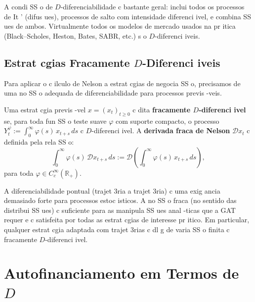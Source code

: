 {A condi SS o de $D$-diferenciabilidade c bastante geral: inclui todos os
processos de It ' (difus ues), processos de salto com intensidade
diferenci ivel, e combina SS ues de ambos. Virtualmente todos os modelos
de mercado usados na pr itica (Black--Scholes, Heston, Bates, SABR,
etc.) s o $D$-diferenci iveis.

\subsection{Estrat cgias Fracamente $D$-Diferenci iveis}

Para aplicar o c ilculo de Nelson a estrat cgias de negocia SS o, precisamos
de uma no SS o adequada de diferenciabilidade para processos previs -veis.

\begin{defi}\label{def:weak_D_strategy}
Uma estrat cgia previs -vel $x = (x_t)_{t \geq 0}$ c dita
\textbf{fracamente $D$-diferenci ivel} se, para toda fun SS o teste suave
$\varphi$ com suporte compacto, o processo $Y_t^\varphi :=
\int_0^\infty \varphi(s)\,x_{t+s}\,ds$ c $D$-diferenci ivel. A
\textbf{derivada fraca de Nelson} $\mathcal{D}x_t$ c definida pela
rela SS o:
\begin{equation}\label{eq:weak_D}
 \int_0^\infty \varphi(s)\,\mathcal{D}x_{t+s}\,ds
 := \mathcal{D}\!\left(\int_0^\infty \varphi(s)\,x_{t+s}\,ds\right),
\end{equation}
para toda $\varphi \in C_c^\infty(\mathbb{R}_+)$.
\end{defi}

\begin{obs}
A diferenciabilidade pontual (trajet 3ria a trajet 3ria) c uma exig ancia
demasiado forte para processos estoc isticos. A no SS o fraca (no sentido
das distribui SS ues) c suficiente para as manipula SS ues anal -ticas que a
GAT requer e c satisfeita por todas as estrat cgias de interesse pr itico.
Em particular, qualquer estrat cgia adaptada com trajet 3rias c dl g de
varia SS o finita c fracamente $D$-diferenci ivel.
\end{obs}

\section{Autofinanciamento em Termos de $D$}

}
